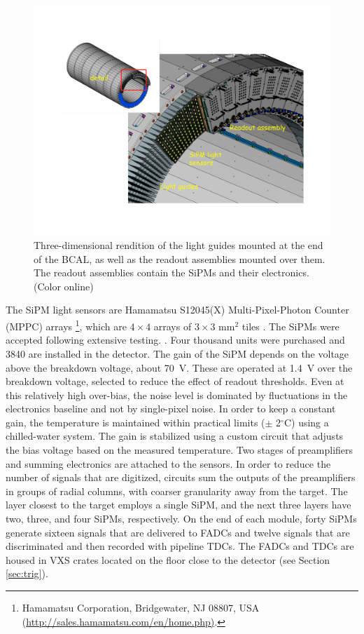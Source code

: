 \begin{figure}[tbp]\centering
\includegraphics[scale=0.4]{figures/bcal_assemblies.pdf}
\caption{\label{fig:bcal:bcal_assemblies}
   Three-dimensional rendition of the light guides mounted at the end of the 
   BCAL, as well as the readout assemblies mounted over them. The 
   readout assemblies contain the 
   SiPMs and their electronics.  (Color online)
  }
\end{figure}


The SiPM light sensors are Hamamatsu S12045(X) Multi-Pixel-Photon Counter (MPPC) arrays \footnote{Hamamatsu Corporation, Bridgewater, NJ 08807, USA \\ (\url{http://sales.hamamatsu.com/en/home.php)}.}, 
which are $4\times4$ arrays of $3\times3$ mm$^2$ tiles \cite{hdnote2913}. The SiPMs were accepted following extensive testing. \cite{Barbosa2012100,Qiang2013234,soto,Soto201489,BeattieIEEE,doi:10.1063/1.4955340}. Four thousand units were purchased and 3840 are installed in the detector. The gain of the SiPM depends on the voltage above the breakdown voltage, about 70~V. These are operated at 1.4~V over the breakdown voltage, selected to reduce the effect of readout thresholds. Even at this relatively high over-bias, the noise level is dominated by fluctuations in the electronics baseline and not by single-pixel noise. In order to keep a constant gain, the temperature is maintained within practical limits ($\pm$ 2$^\circ$C) using a chilled-water system. The gain is stabilized using a custom circuit that adjusts the bias voltage based on the measured temperature. Two stages of preamplifiers and summing electronics are attached to the sensors. In order to reduce the number of signals that are digitized, circuits sum the outputs of the preamplifiers in groups of radial columns, with coarser granularity away from the target. The layer closest to the target employs a single SiPM, and the next three layers have two, three, and four SiPMs, respectively. On the end of each module, forty SiPMs generate sixteen signals that are delivered to FADCs and twelve signals that are discriminated and then recorded with pipeline TDCs. The FADCs and TDCs are housed in VXS crates located on the floor close to the detector (see Section\,\ref{sec:trig}).

